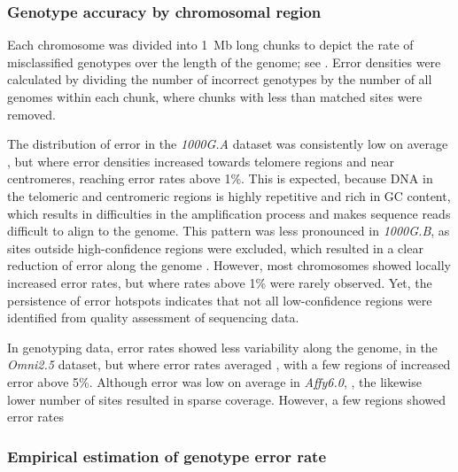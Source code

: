 %
\subsubsection{Genotype accuracy by chromosomal region}
%

Each chromosome was divided into 1~Mb long chunks to depict the rate of misclassified genotypes over the length of the genome; see .
Error densities were calculated by dividing the number of incorrect genotypes by the number of all genomes within each chunk, where chunks with less than  matched sites were removed.

%

%

The distribution of error in the \emph{1000G.A} dataset was consistently low on average , but where error densities increased towards telomere regions and near centromeres, reaching error rates above 1\%.
This is expected, because DNA in the telomeric and centromeric regions is highly repetitive and rich in GC content, which results in difficulties in the amplification process and makes sequence reads difficult to align to the genome.
This pattern was less pronounced in \emph{1000G.B}, as sites outside high-confidence regions were excluded, which resulted in a clear reduction of error along the genome .
However, most chromosomes showed locally increased error rates, but where rates above 1\% were rarely observed.
Yet, the persistence of error hotspots indicates that not all low-confidence regions were identified from quality assessment of sequencing data.

In genotyping data, error rates showed less variability along the genome, \eg in the \emph{Omni2.5} dataset, but where error rates averaged , with a few regions of increased error above 5\%.
Although error was low on average in \emph{Affy6.0}, , the likewise lower number of sites resulted in sparse coverage.
However, a few regions showed error rates 


%
\subsubsection{Empirical estimation of genotype error rate}
%

